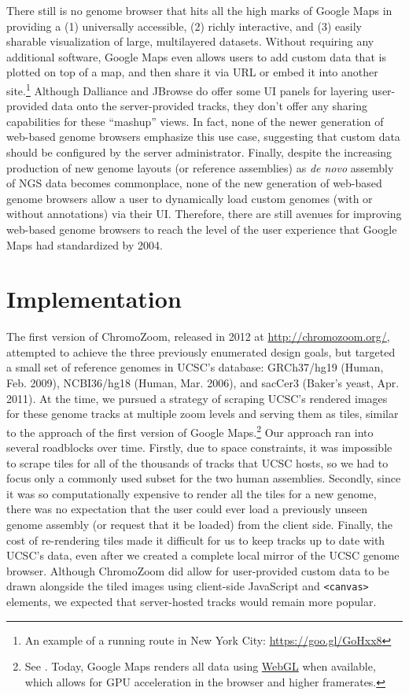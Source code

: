 There still is no genome browser that hits all the high marks of Google Maps in providing a (1) universally accessible, (2) richly interactive, and (3) easily sharable visualization of large, multilayered datasets. Without requiring any additional software, Google Maps even allows users to add custom data that is plotted on top of a map, and then share it via URL or embed it into another site.\footnote{An example of a running route in New York City: \url{https://goo.gl/GoHxx8}} Although Dalliance and JBrowse do offer some UI panels for layering user-provided data onto the server-provided tracks, they don't offer any sharing capabilities for these ``mashup'' views. In fact, none of the newer generation of web-based genome browsers emphasize this use case, suggesting that custom data should be configured by the server administrator. Finally, despite the increasing production of new genome layouts (or reference assemblies) as \emph{de novo} assembly of NGS data becomes commonplace, none of the new generation of web-based genome browsers allow a user to dynamically load custom genomes (with or without annotations) via their UI. Therefore, there are still avenues for improving web-based genome browsers to reach the level of the user experience that Google Maps had standardized by 2004.\autocite{Vincent2007}

\section{Implementation}

The first version of ChromoZoom,\autocite{Pak2013a} released in 2012 at \url{http://chromozoom.org/}, attempted to achieve the three previously enumerated design goals, but targeted a small set of reference genomes in UCSC's database: GRCh37/hg19 (Human, Feb. 2009), NCBI36/hg18 (Human, Mar. 2006), and sacCer3 (Baker's yeast, Apr. 2011). At the time, we pursued a strategy of scraping UCSC's rendered images for these genome tracks at multiple zoom levels and serving them as tiles, similar to the approach of the first version of Google Maps.\footnote{See \textcite{Skinner2009}. Today, Google Maps renders all data using \href{https://developer.mozilla.org/en-US/docs/Web/API/WebGL_API}{WebGL} when available, which allows for GPU acceleration in the browser and higher framerates.} Our approach ran into several roadblocks over time. Firstly, due to space constraints, it was impossible to scrape tiles for all of the thousands of tracks that UCSC hosts, so we had to focus only a commonly used subset for the two human assemblies. Secondly, since it was so computationally expensive to render all the tiles for a new genome, there was no expectation that the user could ever load a previously unseen genome assembly (or request that it be loaded) from the client side. Finally, the cost of re-rendering tiles made it difficult for us to keep tracks up to date with UCSC's data, even after we created a complete local mirror of the UCSC genome browser. Although ChromoZoom did allow for user-provided custom data to be drawn alongside the tiled images using client-side JavaScript and \texttt{<canvas>} elements, we expected that server-hosted tracks would remain more popular.

